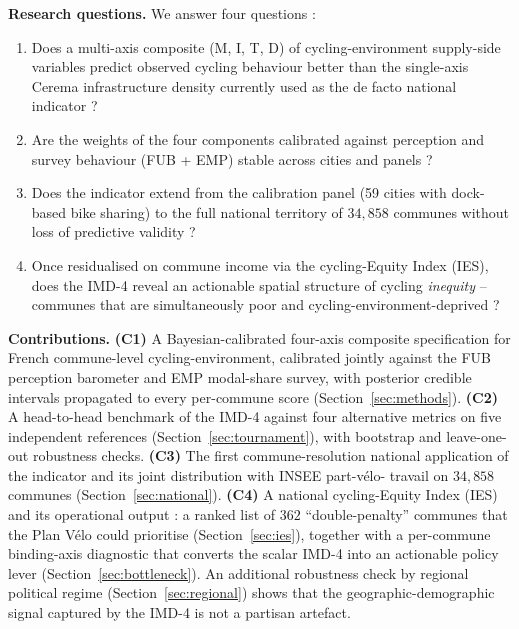 \documentclass[11pt,a4paper]{article}
\begin{document}
\noindent\textbf{Research questions.}
We answer four questions :

\begin{enumerate}[leftmargin=*]
    \item[\textbf{Q1}] Does a multi-axis composite (M, I, T, D) of
          cycling-environment supply-side variables predict observed
          cycling behaviour better than the single-axis Cerema
          infrastructure density currently used as the de facto
          national indicator ?

    \item[\textbf{Q2}] Are the weights of the four components
          calibrated against perception and survey behaviour
          (FUB + EMP) stable across cities and panels ?

    \item[\textbf{Q3}] Does the indicator extend from the calibration
          panel (59 cities with dock-based bike sharing) to the full
          national territory of $34{,}858$ communes without loss of
          predictive validity ?

    \item[\textbf{Q4}] Once residualised on commune income via the
          cycling-Equity Index (IES), does the IMD-4 reveal an
          actionable spatial structure of cycling
          \emph{inequity} -- communes that are simultaneously poor
          and cycling-environment-deprived ?
\end{enumerate}

\noindent\textbf{Contributions.}
\textbf{(C1)} A Bayesian-calibrated four-axis composite
specification for French commune-level cycling-environment,
calibrated jointly against the FUB perception barometer and
EMP modal-share survey, with posterior credible intervals
propagated to every per-commune score (Section~\ref{sec:methods}).
\textbf{(C2)} A head-to-head benchmark of the IMD-4 against four
alternative metrics on five independent references
(Section~\ref{sec:tournament}), with bootstrap and leave-one-out
robustness checks.
\textbf{(C3)} The first commune-resolution national application
of the indicator and its joint distribution with INSEE part-v\'elo-
travail on $34{,}858$ communes (Section~\ref{sec:national}).
\textbf{(C4)} A national cycling-Equity Index (IES) and its
operational output : a ranked list of $362$ ``double-penalty''
communes that the Plan V\'elo could prioritise
(Section~\ref{sec:ies}), together with a per-commune binding-axis
diagnostic that converts the scalar IMD-4 into an actionable
policy lever (Section~\ref{sec:bottleneck}).  An additional
robustness check by regional political regime
(Section~\ref{sec:regional}) shows that the geographic-demographic
signal captured by the IMD-4 is not a partisan artefact.
\end{document}
